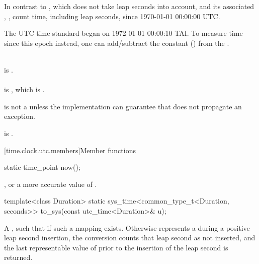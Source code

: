 \pnum
In contrast to ,
which does not take leap seconds into account,
 and its associated , ,
count time, including leap seconds, since 1970-01-01 00:00:00 UTC.
\begin{note}
The UTC time standard began on 1972-01-01 00:00:10 TAI.
To measure time since this epoch instead, one can add/subtract the constant
 ()
from the .
\end{note}
\begin{example}
\\
 is . \\
 \\
is , which is . \\
\end{example}

\pnum
{} is not a 
unless the implementation can guarantee that 
does not propagate an exception.
\begin{note}
 is .
\end{note}

[time.clock.utc.members]{Member functions}

%
\begin{itemdecl}
static time_point now();
\end{itemdecl}

\begin{itemdescr}
\pnum
\returns
{}, or a more accurate value of .
\end{itemdescr}

%
\begin{itemdecl}
template<class Duration>
  static sys_time<common_type_t<Duration, seconds>>
    to_sys(const utc_time<Duration>& u);
\end{itemdecl}

\begin{itemdescr}
\pnum
\returns
A  ,
such that  if such a mapping exists.
Otherwise  represents a 
during a positive leap second insertion,
the conversion counts that leap second as not inserted,
and the last representable value of 
prior to the insertion of the leap second is returned.
\end{itemdescr}

